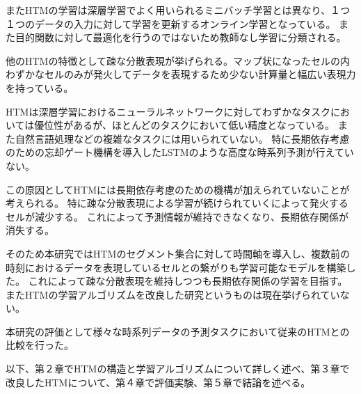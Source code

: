 またHTMの学習は深層学習でよく用いられるミニバッチ学習とは異なり、１つ１つのデータの入力に対して学習を更新するオンライン学習となっている。
また目的関数に対して最適化を行うのではないため教師なし学習に分類される。

他のHTMの特徴として疎な分散表現が挙げられる。マップ状になったセルの内わずかなセルのみが発火してデータを表現するため少ない計算量と幅広い表現力を持っている。

HTMは深層学習におけるニューラルネットワークに対してわずかなタスクにおいては優位性があるが、ほとんどのタスクにおいて低い精度となっている。
また自然言語処理などの複雑なタスクには用いられていない。
特に長期依存考慮のための忘却ゲート機構を導入したLSTM\cite{lstm_forget_gate}のような高度な時系列予測が行えていない。

この原因としてHTMには長期依存考慮のための機構が加えられていないことが考えられる。
特に疎な分散表現による学習が続けられていくによって発火するセルが減少する。
これによって予測情報が維持できなくなり、長期依存関係が消失する。

そのため本研究ではHTMのセグメント集合に対して時間軸を導入し、複数前の時刻におけるデータを表現しているセルとの繋がりも学習可能なモデルを構築した。
これによって疎な分散表現を維持しつつも長期依存関係の学習を目指す。
またHTMの学習アルゴリズムを改良した研究というものは現在挙げられていない。

本研究の評価として様々な時系列データの予測タスクにおいて従来のHTMとの比較を行った。

以下、第２章でHTMの構造と学習アルゴリズムについて詳しく述べ、第３章で改良したHTMについて、第４章で評価実験、第５章で結論を述べる。
